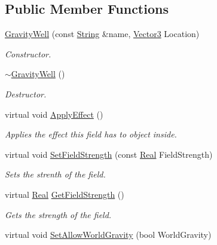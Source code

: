 \subsection*{Public Member Functions}
\begin{DoxyCompactItemize}
\item 
\hyperlink{classphys_1_1GravityWell_afa165244f8bde11f59e249b43da4973b}{GravityWell} (const \hyperlink{namespacephys_aa03900411993de7fbfec4789bc1d392e}{String} \&name, \hyperlink{classphys_1_1Vector3}{Vector3} Location)
\begin{DoxyCompactList}\small\item\em Constructor. \item\end{DoxyCompactList}\item 
\hyperlink{classphys_1_1GravityWell_aeeeb63ceb3feb1223f8339f73412777d}{$\sim$GravityWell} ()
\begin{DoxyCompactList}\small\item\em Destructor. \item\end{DoxyCompactList}\item 
virtual void \hyperlink{classphys_1_1GravityWell_a944817d495baf9f71b6d33a420eccfde}{ApplyEffect} ()
\begin{DoxyCompactList}\small\item\em Applies the effect this field has to object inside. \item\end{DoxyCompactList}\item 
virtual void \hyperlink{classphys_1_1GravityWell_ab4ead80191e25dc9cb017ffaab44602f}{SetFieldStrength} (const \hyperlink{namespacephys_af7eb897198d265b8e868f45240230d5f}{Real} FieldStrength)
\begin{DoxyCompactList}\small\item\em Sets the strenth of the field. \item\end{DoxyCompactList}\item 
virtual \hyperlink{namespacephys_af7eb897198d265b8e868f45240230d5f}{Real} \hyperlink{classphys_1_1GravityWell_afb006e895ec0465cc7d8ee85aff25776}{GetFieldStrength} ()
\begin{DoxyCompactList}\small\item\em Gets the strength of the field. \item\end{DoxyCompactList}\item 
virtual void \hyperlink{classphys_1_1GravityWell_a1dc68391835134835a9969ed823a0b81}{SetAllowWorldGravity} (bool WorldGravity)

\end{DoxyCompactItemize}
